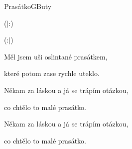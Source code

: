 \setcounter{page}{70}
\begin{song}{Prasátko}{G}{Buty}

\Ch{$|$:}{}     \Ch{:$|$}{}
\begin{SBVerse}


($|$:)

(:$|$)

\end{SBVerse}

\begin{SBVerse}

Měl jsem uši oslintané prasátkem,

které potom zase rychle uteklo.

Někam za láskou a já se trápím otázkou,

co chtělo to malé prasátko.

Někam za láskou a já se trápím otázkou,

co chtělo to malé prasátko.

\end{SBVerse}

\end{song}

\pagebreak
